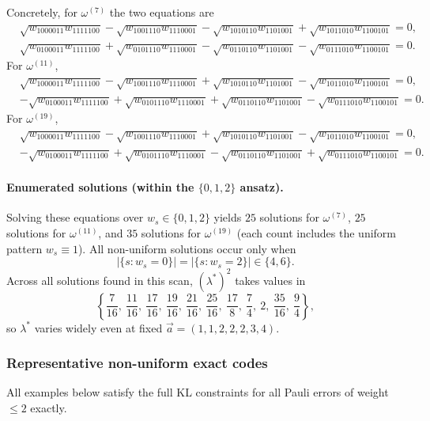 \documentclass[11pt]{article}
\begin{document}
Concretely, for \(\omega^{(7)}\) the two equations are
\[
\begin{aligned}
&\sqrt{w_{1000011}w_{1111100}}
-\sqrt{w_{1001110}w_{1110001}}
-\sqrt{w_{1010110}w_{1101001}}
+\sqrt{w_{1011010}w_{1100101}}=0,\\
&\sqrt{w_{0100011}w_{1111100}}
+\sqrt{w_{0101110}w_{1110001}}
-\sqrt{w_{0110110}w_{1101001}}
-\sqrt{w_{0111010}w_{1100101}}=0.
\end{aligned}
\]
For \(\omega^{(11)}\),
\[
\begin{aligned}
&\sqrt{w_{1000011}w_{1111100}}
-\sqrt{w_{1001110}w_{1110001}}
+\sqrt{w_{1010110}w_{1101001}}
-\sqrt{w_{1011010}w_{1100101}}=0,\\
&-\sqrt{w_{0100011}w_{1111100}}
+\sqrt{w_{0101110}w_{1110001}}
+\sqrt{w_{0110110}w_{1101001}}
-\sqrt{w_{0111010}w_{1100101}}=0.
\end{aligned}
\]
For \(\omega^{(19)}\),
\[
\begin{aligned}
&\sqrt{w_{1000011}w_{1111100}}
-\sqrt{w_{1001110}w_{1110001}}
+\sqrt{w_{1010110}w_{1101001}}
-\sqrt{w_{1011010}w_{1100101}}=0,\\
&-\sqrt{w_{0100011}w_{1111100}}
+\sqrt{w_{0101110}w_{1110001}}
-\sqrt{w_{0110110}w_{1101001}}
+\sqrt{w_{0111010}w_{1100101}}=0.
\end{aligned}
\]

\paragraph{Enumerated solutions (within the \(\{0,1,2\}\) ansatz).}
Solving these equations over \(w_s\in\{0,1,2\}\) yields \(25\) solutions for \(\omega^{(7)}\), \(25\) solutions for \(\omega^{(11)}\), and \(35\) solutions for \(\omega^{(19)}\) (each count includes the uniform pattern \(w_s\equiv 1\)).
All non-uniform solutions occur only when
\[
|\{s:w_s=0\}|=|\{s:w_s=2\}|\in\{4,6\}.
\]
Across all solutions found in this scan, \((\lambda^\ast)^2\) takes values in
\[
\left\{
\frac{7}{16},\ \frac{11}{16},\ \frac{17}{16},\ \frac{19}{16},\ \frac{21}{16},\ \frac{25}{16},\ \frac{17}{8},\ \frac{7}{4},\ 2,\ \frac{35}{16},\ \frac{9}{4}
\right\},
\]
so \(\lambda^\ast\) varies widely even at fixed \(\vec a=(1,1,2,2,2,3,4)\).

\subsubsection{Representative non-uniform exact codes}

All examples below satisfy the full KL constraints for all Pauli errors of weight \(\le 2\) exactly.
\end{document}

